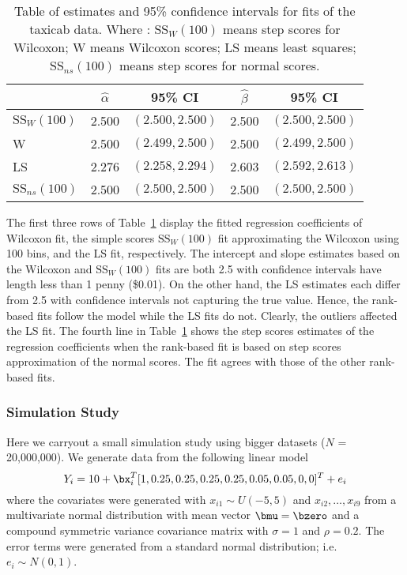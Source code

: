 \begin{table}
\centering
\begin{tabular}{|l|c|c|c|c|}\hline
& $\widehat{\alpha}$& 95\% CI & $\widehat{\beta}$& 95\% CI \\ \hline
	$\mbox{SS}_W(100)$ & 2.500 & $(2.500,2.500)$ & 2.500 & $(2.500,2.500)$ \\ \hline
	W & 2.500 & $(2.499,2.500)$ & 2.500 & $(2.499,2.500)$ \\ \hline
	LS & 2.276 & $(2.258,2.294)$ & 2.603 & $(2.592,2.613)$ \\ \hline
	$\mbox{SS}_{ns}(100)$ & 2.500 & $(2.500,2.500)$ & 2.500 & $(2.500,2.500)$ \\ \hline
\end{tabular}
\caption{Table of estimates and 95\% confidence intervals for fits of the taxicab data.
Where :
$\mbox{SS}_W(100)$ means step scores for Wilcoxon; W means Wilcoxon scores; LS means least squares; $\mbox{SS}_{ns}(100)$ means step scores for normal scores.}
\label{tabtax1}
\end{table}

The first three rows of Table~\ref{tabtax1} display the fitted regression coefficients of Wilcoxon fit, the simple
scores $\mbox{SS}_W(100)$ fit approximating the Wilcoxon using 100 bins, and the LS fit, respectively.
The intercept and slope estimates based on the Wilcoxon and $\mbox{SS}_W(100)$ fits are both 2.5
with confidence intervals have length less than 1 penny (\$0.01).
On the other hand, the LS estimates each differ from 2.5 with confidence intervals not capturing the true value.
Hence, the rank-based fits follow the model while the LS fits do not.
Clearly, the outliers affected the LS fit.
 The fourth line in Table~\ref{tabtax1} shows the step scores estimates of the regression coefficients when the rank-based fit is based on step scores approximation of the normal scores.  The fit agrees with those of the other rank-based fits.

\subsubsection{Simulation Study}

Here we carryout a small simulation study using bigger datasets ($N$ = 20,000,000).
We generate data from the following linear model
\begin{equation}
Y_i = 10 + \bx_i^T [1,0.25,0.25,0.25,0.25,0.05,0.05,0,0]^T + e_i
\end{equation}
where 
the covariates were generated with
$x_{i1} \sim U(-5,5)$ and
$x_{i2},\ldots, x_{i9}$ from a multivariate normal distribution with mean vector $\bmu = \bzero$ and a compound symmetric variance covariance matrix with $\sigma = 1$ and $\rho = 0.2$.
The error terms were generated from a standard normal distribution; i.e. $e_i \sim N(0,1)$.

